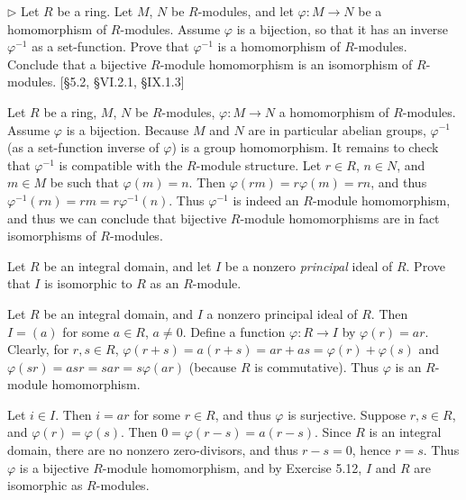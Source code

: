 \begin{problem}
	$\triangleright$ Let $R$ be a ring. Let $M$, $N$ be $R$-modules, and let $\varphi: M \to N$ be a homomorphism of $R$-modules. Assume $\varphi$ is a bijection, so that it has an inverse $\varphi^{-1}$ as a set-function. Prove that $\varphi^{-1}$ is a homomorphism of $R$-modules. Conclude that a bijective $R$-module homomorphism is an isomorphism of $R$-modules. [\S 5.2, \S VI.2.1, \S IX.1.3]
\end{problem}

\begin{solution}
	Let $R$ be a ring, $M$, $N$ be $R$-modules, $\varphi: M \to N$ a homomorphism of $R$-modules. Assume $\varphi$ is a bijection. Because $M$ and $N$ are in particular abelian groups, $\varphi^{-1}$ (as a set-function inverse of $\varphi$) is a group homomorphism. It remains to check that $\varphi^{-1}$ is compatible with the $R$-module structure. Let $r \in R$, $n \in N$, and $m \in M$ be such that $\varphi(m) = n$. Then $\varphi(rm) = r \varphi(m) = rn$, and thus $\varphi^{-1}(rn) = rm = r \varphi^{-1}(n)$. Thus $\varphi^{-1}$ is indeed an $R$-module homomorphism, and thus we can conclude that bijective $R$-module homomorphisms are in fact isomorphisms of $R$-modules.
\end{solution}

\begin{problem}
	Let $R$ be an integral domain, and let $I$ be a nonzero \emph{principal} ideal of $R$. Prove that $I$ is isomorphic to $R$ as an $R$-module.
\end{problem}

\begin{solution}
	Let $R$ be an integral domain, and $I$ a nonzero principal ideal of $R$. Then $I = (a)$ for some $a \in R$, $a \neq 0$. Define a function $\varphi: R \to I$ by $\varphi(r) = ar$. Clearly, for $r, s \in R$, $\varphi(r+s) = a(r+s) = ar+as = \varphi(r) + \varphi(s)$ and $\varphi(sr) = asr = sar = s \varphi(ar)$ (because $R$ is commutative). Thus $\varphi$ is an $R$-module homomorphism.
	
	Let $i \in I$. Then $i = ar$ for some $r \in R$, and thus $\varphi$ is surjective. Suppose $r, s \in R$, and $\varphi(r) = \varphi(s)$. Then $0 = \varphi(r - s) = a(r - s)$. Since $R$ is an integral domain, there are no nonzero zero-divisors, and thus $r - s = 0$, hence $r = s$. Thus $\varphi$ is a bijective $R$-module homomorphism, and by Exercise 5.12, $I$ and $R$ are isomorphic as $R$-modules.
\end{solution}

